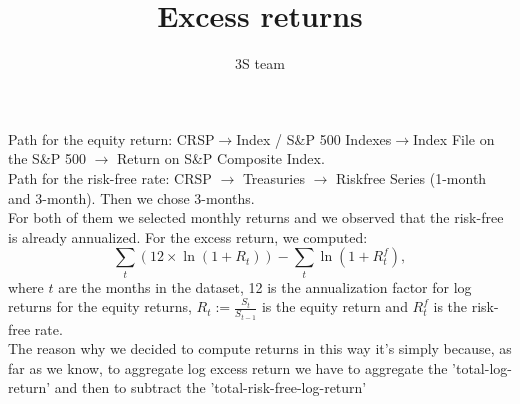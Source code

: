 \documentclass{article}
\title{Excess returns}
\author{3S team}
\begin{document}
\maketitle


Path for the equity return: CRSP$\rightarrow$Index / S\&P 500 Indexes$\rightarrow$Index File on the S\&P 500  $\rightarrow$ Return on S\&P Composite Index.\\
Path for the risk-free rate: CRSP $\rightarrow$ Treasuries $\rightarrow$ Riskfree Series (1-month and 3-month). Then we chose 3-months.\\
For both of them we selected monthly returns and we observed that the risk-free is already annualized. For the excess return, we computed:
$$
    \sum_t(12\times\ln(1+R_t)) - \sum_t \ln(1+R_t^f),
$$
where $t$ are the months in the dataset, 12 is the annualization factor for log returns for the equity returns, $R_t:=\frac{S_t}{S_{t-1}}$ is the equity return and $R_t^f$ is the risk-free rate.\\
The reason why we decided to compute returns in this way it's simply because, as far as we know, to aggregate log excess return we have to aggregate the 'total-log-return' and then to subtract the 'total-risk-free-log-return'
\end{document}

